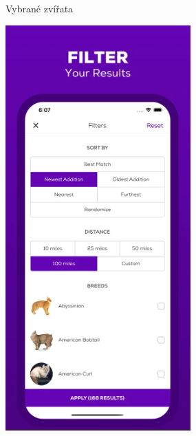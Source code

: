 \documentclass[12pt,a4paper]{report}
\begin{document}
\begin{figure}[h!]
\begin{subfigure}{0.22\textwidth}
        \caption{Vybrané zvířata} %
        \label{fig:obrazek2}
    \end{subfigure}
    \hfill
    \begin{subfigure}{0.22\textwidth}
        \centering
        \includegraphics[width=\textwidth]{img/petfinder3.png} %

\end{subfigure}
\end{figure}
\end{document}
